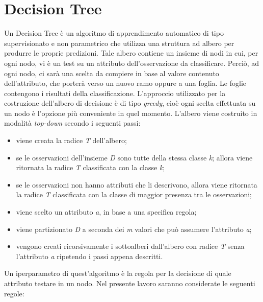 \section{Decision Tree}
Un Decision Tree \autocite{charbuty2021classification} è un algoritmo di apprendimento automatico di tipo supervisionato e non parametrico che utilizza una struttura ad albero per produrre le proprie predizioni. Tale albero contiene un insieme di nodi in cui, per ogni nodo, vi è un test su un attributo dell'osservazione da classificare. Perciò, ad ogni nodo, ci sarà una scelta da compiere in base al valore contenuto dell'attributo, che porterà verso un nuovo ramo oppure a una foglia. Le foglie contengono i risultati della classificazione. L'approccio utilizzato per la costruzione dell'albero di decisione è di tipo \emph{greedy}, cioè ogni scelta effettuata su un nodo è l'opzione più conveniente in quel momento. L'albero viene costruito in modalità \emph{top-down} secondo i seguenti passi:
\begin{itemize}
	\item viene creata la radice \emph{T} dell'albero;
	\item se le osservazioni dell'insieme \emph{D} sono tutte della stessa classe \emph{k}; allora viene ritornata la radice \emph{T} classificata con la classe \emph{k};
	\item se le osservazioni non hanno attributi che li descrivono, allora viene ritornata la radice \emph{T} classificata con la classe di maggior presenza tra le osservazioni;
	\item viene scelto un attributo \emph{a}, in base a una specifica regola;
	\item viene partizionato \emph{D} a seconda dei \emph{m} valori che può assumere l'attributo \emph{a};
	\item vengono creati ricorsivamente i sottoalberi dall'albero con radice \emph{T} senza l'attributo \emph{a} ripetendo i passi appena descritti.
\end{itemize} 
Un iperparametro di quest'algoritmo è la regola per la decisione di quale attributo testare in un nodo. Nel presente lavoro saranno considerate le seguenti regole:
